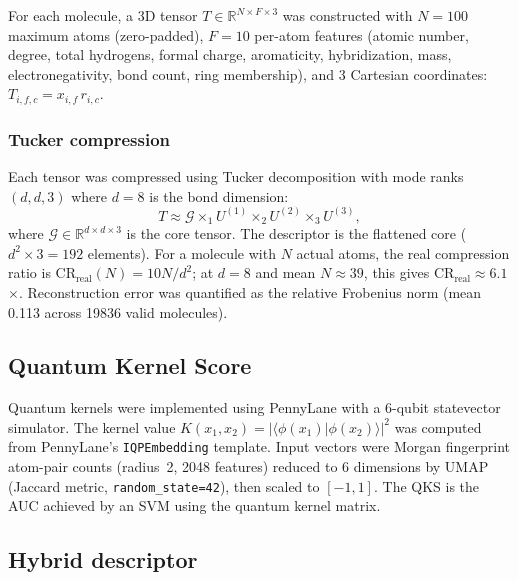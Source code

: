 \documentclass[pdflatex,sn-mathphys-num]{sn-jnl}%
\begin{document}
For each molecule, a 3D tensor $T \in \mathbb{R}^{N \times F \times 3}$ was constructed with $N = 100$ maximum atoms (zero-padded), $F = 10$ per-atom features (atomic number, degree, total hydrogens, formal charge, aromaticity, hybridization, mass, electronegativity, bond count, ring membership), and 3 Cartesian coordinates: $T_{i,f,c} = x_{i,f} \, r_{i,c}$.

\subsubsection{Tucker compression}

Each tensor was compressed using Tucker decomposition \cite{tensorly_2019} with mode ranks $(d, d, 3)$ where $d = 8$ is the bond dimension:
\begin{equation}
T \approx \mathcal{G} \times_1 U^{(1)} \times_2 U^{(2)} \times_3 U^{(3)},
\end{equation}
where $\mathcal{G} \in \mathbb{R}^{d \times d \times 3}$ is the core tensor. The descriptor is the flattened core ($d^2 \times 3 = 192$ elements). For a molecule with $N$ actual atoms, the real compression ratio is $\mathrm{CR}_{\text{real}}(N) = 10N / d^2$; at $d = 8$ and mean $N \approx 39$, this gives $\mathrm{CR}_{\text{real}} \approx \num{6.1}$$\times$. Reconstruction error was quantified as the relative Frobenius norm (mean \num{0.113} across \num{19836} valid molecules).

\subsection{Quantum Kernel Score}

Quantum kernels were implemented using PennyLane \cite{pennylane_2024} with a 6-qubit statevector simulator. The kernel value $K(x_1, x_2) = |\langle \phi(x_1) | \phi(x_2) \rangle|^2$ was computed from PennyLane's \texttt{IQPEmbedding} template. Input vectors were Morgan fingerprint atom-pair counts (radius~2, \num{2048} features) reduced to 6 dimensions by UMAP (Jaccard metric, \texttt{random\_state=42}), then scaled to $[-1, 1]$. The QKS is the AUC achieved by an SVM using the quantum kernel matrix.

\subsection{Hybrid descriptor}
\end{document}
